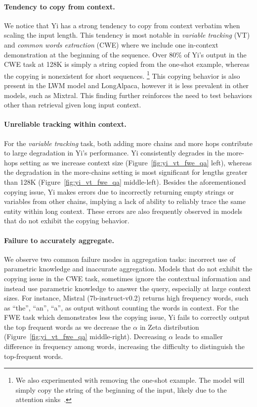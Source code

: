 \paragraph{Tendency to copy from context.} We notice that Yi has a strong tendency to copy from context verbatim when scaling the input length. This tendency is most notable in \emph{variable tracking} (VT) and \emph{common words extraction} (CWE) where we include one in-context demonstration at the beginning of the sequence. Over 80\% of Yi's output in the CWE task at 128K is simply a string copied from the one-shot example, whereas the copying is nonexistent for short sequences. \footnote{We also experimented with removing the one-shot example. The model will simply copy the string of the beginning of the input, likely due to the attention sinks~\citep{streemllm}.} This copying behavior is also present in the LWM model and LongAlpaca, however it is less prevalent in other models, such as Mixtral. This finding further reinforces the need to test behaviors other than retrieval given long input context.

\paragraph{Unreliable tracking within context.} For the \emph{variable tracking} task, both adding more chains and more hops contribute to large degradation in Yi's performance. Yi consistently degrades in the more-hops setting as we increase context size (Figure~\ref{fig:yi_vt_fwe_qa} left), whereas the degradation in the more-chains setting is most significant for lengths greater than 128K (Figure~\ref{fig:yi_vt_fwe_qa} middle-left). Besides the aforementioned copying issue, Yi makes errors due to incorrectly returning empty strings or variables from other chains, implying a lack of ability to reliably trace the same entity within long context. These errors are also frequently observed in models that do not exhibit the copying behavior.

\paragraph{Failure to accurately aggregate.} We observe two common failure modes in aggregation tasks: incorrect use of parametric knowledge and inaccurate aggregation. Models that do not exhibit the copying issue in the CWE task, sometimes ignore the contextual information and instead use parametric knowledge to answer the query, especially at large context sizes. For instance, Mistral (7b-instruct-v0.2) returns high frequency words, such as ``the'', ``an'', ``a'', as output without counting the words in context. For the FWE task which demonstrates less the copying issue, Yi fails to correctly output the top frequent words as we decrease the $\alpha$ in Zeta distribution (Figure~\ref{fig:yi_vt_fwe_qa} middle-right). Decreasing $\alpha$ leads to smaller difference in frequency among words, increasing the difficulty to distinguish the top-frequent words.

